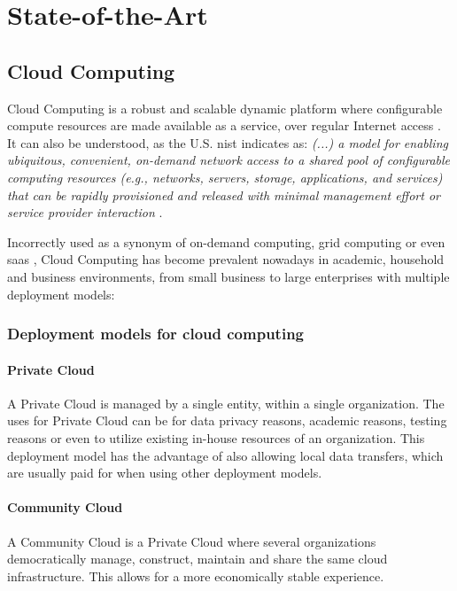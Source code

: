 \chapter{State-of-the-Art}\label{state-of-the-art}

\section{Cloud Computing}\label{state-of-the-art:s:cloud-computing}

Cloud Computing is a robust and scalable dynamic platform where configurable compute resources are made available as a service, over regular Internet access \Parencite{alnumay_2020}.
It can also be understood, as the U.S. \gls{nist} indicates as:
\textit{(...) a model for enabling ubiquitous, convenient, on-demand network access to a shared pool of configurable computing resources (e.g., networks, servers, storage, applications, and services) that can be rapidly provisioned and released with minimal management effort or service provider interaction} \Parencite{mell_grance_2011}. 

Incorrectly used as a synonym of on-demand computing, grid computing or even \gls{saas} \Parencite{kim_2009}, Cloud Computing has become prevalent nowadays in academic, household and business environments, from small business to large enterprises \parencite{rezaei_chiew_lee_shams_aliee_2014} with multiple deployment models:

\subsection{Deployment models for cloud computing}\label{state-of-the-art:ss:deployment-models-for-cloud-computing}

\subsubsection{Private Cloud}\label{state-of-the-art:sss:private-cloud}
A Private Cloud is managed by a single entity, within a single organization. The uses for Private Cloud can be for data privacy reasons, academic reasons, testing reasons or even to utilize existing in-house resources of an organization. This deployment model has the advantage of also allowing local data transfers, which are usually paid for when using other deployment models.

\subsubsection{Community Cloud}\label{state-of-the-art:sss:community-cloud}
A Community Cloud is a Private Cloud where several organizations democratically manage, construct, maintain and share the same cloud infrastructure. This allows for a more economically stable experience.

